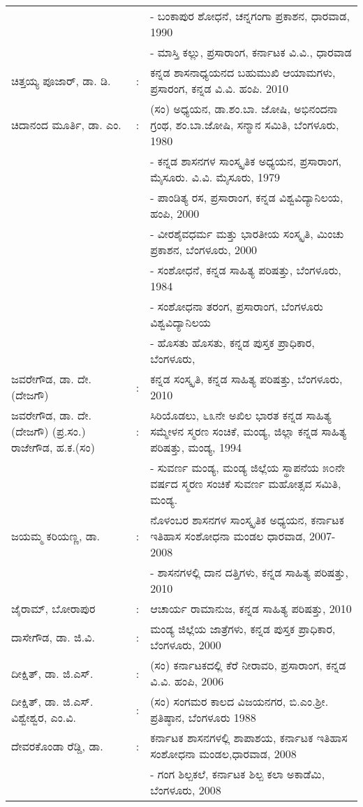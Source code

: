 \begin{longtable}[l]{@{}>{\raggedright}p{4.7cm}cp{9.2cm}<{\raggedright}@{}}
&& - ಬಂಕಾಪುರ ಶೋಧನೆ, ಚನ್ನಗಂಗಾ ಪ್ರಕಾಶನ, ಧಾರವಾಡ, 1990\\
&& - ಮಾಸ್ತಿ ಕಲ್ಲು, ಪ್ರಸಾರಾಂಗ, ಕರ್ನಾಟಕ ವಿ.ವಿ., ಧಾರವಾಡ\\
ಚಿತ್ತಯ್ಯ ಪೂಜಾರ್​, ಡಾ. ಡಿ. & : &  ಕನ್ನಡ ಶಾಸನಾಧ್ಯಯನದ ಬಹುಮುಖಿ ಆಯಾಮಗಳು, ಪ್ರಸಾರಂಗ, ಕನ್ನಡ ವಿ.ವಿ. ಹಂಪಿ. 2010\\
ಚಿದಾನಂದ ಮೂರ್ತಿ, ಡಾ. ಎಂ.  & : & (ಸಂ) ಅಧ್ಯಯನ, ಡಾ.ಶಂ.ಬಾ. ಜೋಷಿ, ಅಭಿನಂದನಾ ಗ್ರಂಥ, ಶಂ.ಬಾ.ಜೋಷಿ, ಸನ್ಮಾನ ಸಮಿತಿ, ಬೆಂಗಳೂರು, 1980\\
&& - ಕನ್ನಡ ಶಾಸನಗಳ ಸಾಂಸ್ಕೃತಿಕ ಅಧ್ಯಯನ, ಪ್ರಸಾರಾಂಗ, ಮೈಸೂರು. ವಿ.ವಿ. ಮೈಸೂರು, 1979\\
&& - ಪಾಂಡಿತ್ಯ ರಸ, ಪ್ರಸಾರಾಂಗ, ಕನ್ನಡ ವಿಶ್ವವಿದ್ಯಾನಿಲಯ, ಹಂಪಿ, 2000\\
&& - ವೀರಶೈವಧರ್ಮ ಮತ್ತು ಭಾರತೀಯ ಸಂಸ್ಕೃತಿ, ಮಿಂಚು ಪ್ರಕಾಶನ, ಬೆಂಗಳೂರು, 2000\\
&& - ಸಂಶೋಧನೆ, ಕನ್ನಡ ಸಾಹಿತ್ಯ ಪರಿಷತ್ತು, ಬೆಂಗಳೂರು, 1984\\
&& - ಸಂಶೋಧನಾ ತರಂಗ, ಪ್ರಸಾರಾಂಗ, ಬೆಂಗಳೂರು ವಿಶ್ವವಿದ್ಯಾನಿಲಯ\\
&& - ಹೊಸತು ಹೊಸತು, ಕನ್ನಡ ಪುಸ್ತಕ ಪ್ರಾಧಿಕಾರ, ಬೆಂಗಳೂರು,\\
ಜವರೇಗೌಡ, ಡಾ. ದೇ. (ದೇಜಗೌ) & : & ಕನ್ನಡ ಸಂಸ್ಕೃತಿ, ಕನ್ನಡ ಸಾಹಿತ್ಯ ಪರಿಷತ್ತು, ಬೆಂಗಳೂರು, 2010\\
ಜವರೇಗೌಡ, ಡಾ. ದೇ.(ದೇಜಗೌ) (ಪ್ರ.ಸಂ.) ರಾಜೇಗೌಡ, ಹ.ಕ.(ಸಂ) & : & ಸಿರಿಯೊಡಲು, ೬೩ನೇ ಅಖಿಲ ಭಾರತ ಕನ್ನಡ ಸಾಹಿತ್ಯ ಸಮ್ಮೇಳನ ಸ್ಮರಣ ಸಂಚಿಕೆ, ಮಂಡ್ಯ, ಜಿಲ್ಲಾ ಕನ್ನಡ ಸಾಹಿತ್ಯ ಪರಿಷತ್ತು, ಮಂಡ್ಯ, 1994\\
&& - ಸುವರ್ಣ ಮಂಡ್ಯ, ಮಂಡ್ಯ ಜಿಲ್ಲೆಯ ಸ್ಥಾಪನೆಯ ೫೦ನೇ ವರ್ಷದ ಸ್ಮರಣ ಸಂಚಿಕೆ ಸುವರ್ಣ ಮಹೋತ್ಸವ ಸಮಿತಿ, ಮಂಡ್ಯ.\\
ಜಯಮ್ಮ ಕರಿಯಣ್ಣ, ಡಾ. & : & ನೊಳಂಬರ ಶಾಸನಗಳ ಸಾಂಸ್ಕೃತಿಕ ಅಧ್ಯಯನ, ಕರ್ನಾಟಕ ಇತಿಹಾಸ ಸಂಶೋಧನಾ ಮಂಡಲ ಧಾರವಾಡ, 2007-2008\\
&& - ಶಾಸನಗಳಲ್ಲಿ ದಾನ ದತ್ತಿಗಳು, ಕನ್ನಡ ಸಾಹಿತ್ಯ ಪರಿಷತ್ತು, 2010\\
ಜೈರಾಮ್, ಬೋರಾಪುರ & : &  ಆಚಾರ್ಯ ರಾಮಾನುಜ, ಕನ್ನಡ ಸಾಹಿತ್ಯ ಪರಿಷತ್ತು, 2010\\
ದಾಸೇಗೌಡ, ಡಾ. ಜಿ.ವಿ. & : &  ಮಂಡ್ಯ ಜಿಲ್ಲೆಯ ಜಾತ್ರೆಗಳು, ಕನ್ನಡ ಪುಸ್ತಕ ಪ್ರಾಧಿಕಾರ, ಬೆಂಗಳೂರು, 2000\\
ದೀಕ್ಷಿತ್​, ಡಾ. ಜಿ.ಎಸ್​. & : &  (ಸಂ) ಕರ್ನಾಟಕದಲ್ಲಿ ಕೆರೆ ನೀರಾವರಿ, ಪ್ರಸಾರಾಂಗ, ಕನ್ನಡ ವಿ.ವಿ. ಹಂಪಿ, 2006\\
ದೀಕ್ಷಿತ್​, ಡಾ. ಜಿ.ಎಸ್​. ವಿಶ್ವೇಶ್ವರ, ಎಂ.ವಿ. & : &  (ಸಂ) ಸಂಗಮರ ಕಾಲದ ವಿಜಯನಗರ, ಬಿ.ಎಂ.ಶ‍್ರೀ. ಪ್ರತಿಷ್ಠಾನ, ಬೆಂಗಳೂರು 1988\\
ದೇವರಕೊಂಡಾ ರೆಡ್ಡಿ, ಡಾ. & : & ಕರ್ನಾಟಕ ಶಾಸನಗಳಲ್ಲಿ ಶಾಪಾಶಯ, ಕರ್ನಾಟಕ ಇತಿಹಾಸ ಸಂಶೋಧನಾ ಮಂಡಲ,ಧಾರವಾಡ, 2008\\
&& - ಗಂಗ ಶಿಲ್ಪಕಲೆ, ಕರ್ನಾಟಕ ಶಿಲ್ಪ ಕಲಾ ಅಕಾಡೆಮಿ, ಬೆಂಗಳೂರು, 2008\\

\end{longtable}
